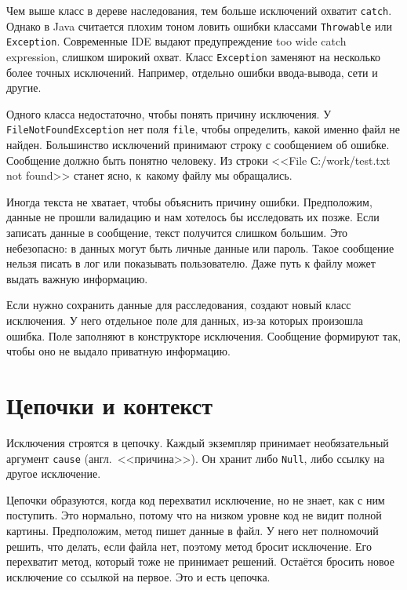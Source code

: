 Чем выше класс в дереве наследования, тем больше исключений охватит
\verb|catch|. Однако в Java считается плохим тоном ловить ошибки классами
\verb|Throwable| или \verb|Exception|. Современные IDE выдают предупреждение too
wide catch expression, слишком широкий охват. Класс \verb|Exception| заменяют на
несколько более точных исключений. Например, отдельно ошибки ввода-вывода, сети
и другие.

Одного класса недостаточно, чтобы понять причину исключения. У
\texttt{FileNotFoundException} нет поля \verb|file|, чтобы определить, какой
именно файл не найден. Большинство исключений принимают строку с сообщением об
ошибке. Сообщение должно быть понятно человеку. Из строки <<File
С:/work/test.txt not found>> станет ясно, к~какому файлу мы обращались.


Иногда текста не хватает, чтобы объяснить причину ошибки. Предположим, данные не
прошли валидацию и нам хотелось бы исследовать их позже. Если записать данные в
сообщение, текст получится слишком большим. Это небезопасно: в данных могут быть
личные данные или пароль. Такое сообщение нельзя писать в лог или показывать
пользователю. Даже путь к файлу может выдать важную информацию.

Если нужно сохранить данные для расследования, создают новый класс исключения. У
него отдельное поле для данных, из-за которых произошла ошибка. Поле заполняют в
конструкторе исключения. Сообщение формируют так, чтобы оно не выдало приватную
информацию.

\section{Цепочки и контекст}


Исключения строятся в цепочку. Каждый экземпляр принимает необязательный
аргумент \verb|cause| (англ.~<<причина>>). Он хранит либо \verb|Null|, либо
ссылку на другое исключение.



Цепочки образуются, когда код перехватил исключение, но не знает, как с ним
поступить.  Это нормально, потому что на низком уровне код не видит полной
картины. Предположим, метод пишет данные в файл. У него нет полномочий решить,
что делать, если файла нет, поэтому метод бросит исключение. Его перехватит
метод, который тоже не принимает решений. Остаётся бросить новое исключение
со ссылкой на первое. Это и есть цепочка.

